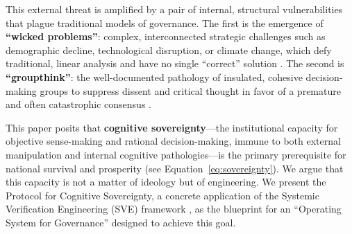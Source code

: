 \documentclass[11pt,a4paper]{article}
\begin{document}
\begin{small}
This external threat is amplified by a pair of internal, structural vulnerabilities that plague traditional models of governance. The first is the emergence of \textbf{``wicked problems''}: complex, interconnected strategic challenges such as demographic decline, technological disruption, or climate change, which defy traditional, linear analysis and have no single ``correct'' solution \citep{Rittel1973}. The second is \textbf{``groupthink''}: the well-documented pathology of insulated, cohesive decision-making groups to suppress dissent and critical thought in favor of a premature and often catastrophic consensus \citep{Janis1982}.

This paper posits that \textbf{cognitive sovereignty}—the institutional capacity for objective sense-making and rational decision-making, immune to both external manipulation and internal cognitive pathologies—is the primary prerequisite for national survival and prosperity (see Equation~\eqref{eq:sovereignty}). We argue that this capacity is not a matter of ideology but of engineering. We present the Protocol for Cognitive Sovereignty, a concrete application of the Systemic Verification Engineering (SVE) framework \citep{Kovnatsky2025SVE2}, as the blueprint for an ``Operating System for Governance'' designed to achieve this goal.

\begin{figure}[h!]
\centering
{}
\end{figure}
\end{small}
\end{document}
